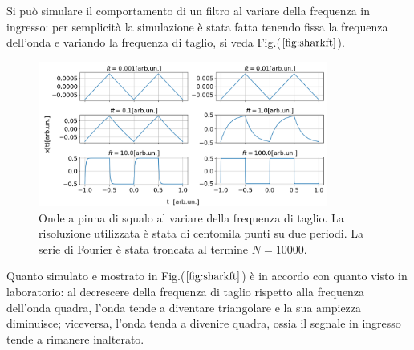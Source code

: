 \documentclass{article}
\begin{document}
                Si può simulare il comportamento di  un filtro al
                variare della frequenza in ingresso: per semplicità 
                la simulazione è stata fatta tenendo fissa la frequenza dell'onda e 
                variando la frequenza di taglio, si veda Fig.($\ref{fig:sharkft}$).
                    \begin{figure}[H]
                        \centering
                        \includegraphics[width=0.85\textwidth]{fousharkfinsfts1.png} %
                        \caption{Onde a pinna di squalo al variare della frequenza di taglio.
                        La risoluzione utilizzata è stata di centomila punti su due periodi.
                        La serie di Fourier è stata troncata al termine $N=10000$.}
                        \label{fig:sharkft}
                    \end{figure}

                \noindent Quanto simulato e mostrato in Fig.($\ref{fig:sharkft}$)
                è in accordo con quanto visto in laboratorio: 
                al decrescere della frequenza di taglio rispetto alla frequenza dell'onda quadra,
                l'onda tende a diventare triangolare e la sua ampiezza diminuisce; viceversa,
                l'onda tenda a divenire quadra, ossia il segnale in ingresso tende a 
                rimanere inalterato.
            
            
\end{document}
